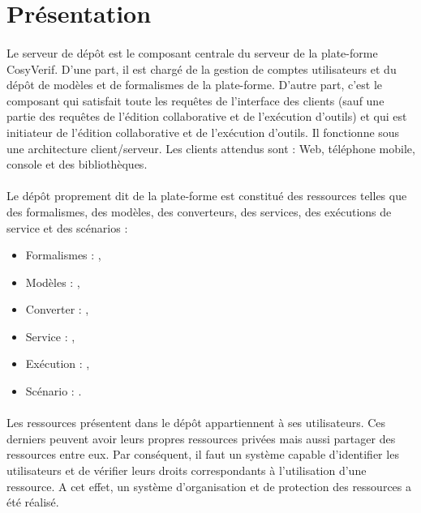 \documentclass{report}
\begin{document}
\section{Présentation}

\paragraph{}
Le serveur de dépôt est le composant centrale du serveur de la plate-forme CosyVerif. D'une part, il est chargé de la
gestion de comptes utilisateurs et du dépôt de modèles et de formalismes de la plate-forme. D'autre part, c'est le composant  qui satisfait toute les requêtes de l'interface des clients (sauf une partie des requêtes de l'édition 
collaborative et de l'exécution d'outils) et qui est initiateur de l'édition collaborative et de l'exécution d'outils. Il
fonctionne sous une architecture client/serveur. Les clients attendus sont : Web, téléphone mobile, console et des 
bibliothèques.

\paragraph{}
Le dépôt proprement dit de la plate-forme est constitué des ressources telles que des formalismes, 
des modèles, des converteurs, des services, des exécutions de service et des scénarios :

\begin{itemize}
\item Formalismes : ,
\item Modèles : ,
\item Converter : ,
\item Service : ,
\item Exécution : ,
\item Scénario : .
\end{itemize}

\paragraph{}
Les ressources présentent dans le dépôt appartiennent à ses utilisateurs. Ces derniers peuvent avoir leurs propres
ressources privées mais aussi partager des ressources entre eux. Par conséquent, il faut un système capable d'identifier
les utilisateurs et de vérifier leurs droits correspondants à l'utilisation d'une ressource. A cet effet, un système 
d'organisation et de protection des ressources a été réalisé.
\end{document}
